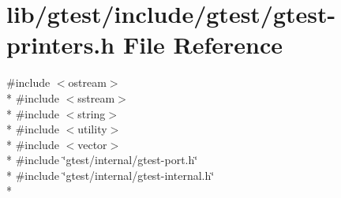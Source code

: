 \hypertarget{gtest-printers_8h}{\section{lib/gtest/include/gtest/gtest-\/printers.h File Reference}
\label{gtest-printers_8h}
}
{\ttfamily \#include $<$ostream$>$}\\*
{\ttfamily \#include $<$sstream$>$}\\*
{\ttfamily \#include $<$string$>$}\\*
{\ttfamily \#include $<$utility$>$}\\*
{\ttfamily \#include $<$vector$>$}\\*
{\ttfamily \#include \char`\"{}gtest/internal/gtest-\/port.\-h\char`\"{}}\\*
{\ttfamily \#include \char`\"{}gtest/internal/gtest-\/internal.\-h\char`\"{}}\\*
